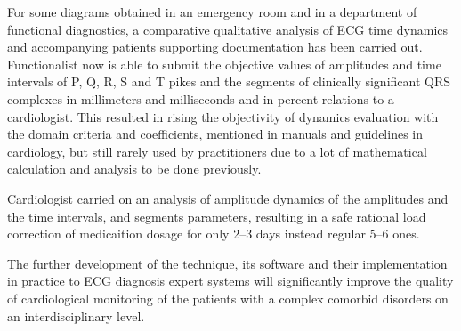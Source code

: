 \documentclass[runningheads]{AIIT}
\begin{document}
For some diagrams obtained in an emergency room and in a department of functional diagnostics, a comparative qualitative analysis of ECG time dynamics and accompanying patients supporting documentation has been carried out.  Functionalist now is able to submit the objective values of amplitudes and time intervals of P, Q, R, S and T pikes and the segments of clinically significant QRS complexes in millimeters and milliseconds and in percent relations to a cardiologist.  This resulted in rising the objectivity of dynamics evaluation with the domain criteria and coefficients, mentioned in manuals and guidelines in cardiology, but still rarely used by practitioners due to a lot of mathematical calculation and analysis to be done previously.

Cardiologist carried on an analysis of amplitude dynamics of the amplitudes and the time intervals, and segments parameters, resulting in a safe rational load correction of medicaition dosage for only 2--3 days instead regular 5--6 ones.

The further development of the technique, its software and their implementation in practice to ECG diagnosis expert systems will significantly improve the quality of cardiological monitoring of the patients with a complex comorbid disorders on an interdisciplinary level.
\end{document}
